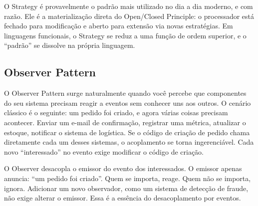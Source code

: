O Strategy é provavelmente o padrão mais utilizado no dia a dia moderno, e com
razão. Ele é a materialização direta do Open/Closed Principle: o processador
está fechado para modificação e aberto para extensão via novas estratégias.
Em linguagens funcionais, o Strategy se reduz a uma função de ordem superior,
e o ``padrão'' se dissolve na própria linguagem.

\subsection{Observer Pattern}

O Observer Pattern surge naturalmente quando você percebe que componentes do
seu sistema precisam reagir a eventos sem conhecer uns aos outros. O cenário
clássico é o seguinte: um pedido foi criado, e agora várias coisas precisam
acontecer. Enviar um e-mail de confirmação, registrar uma métrica, atualizar
o estoque, notificar o sistema de logística. Se o código de criação de pedido
chama diretamente cada um desses sistemas, o acoplamento se torna ingerenciável.
Cada novo ``interessado'' no evento exige modificar o código de criação.

O Observer desacopla o emissor do evento dos interessados. O emissor apenas
anuncia: ``um pedido foi criado''. Quem se importa, reage. Quem não se importa,
ignora. Adicionar um novo observador, como um sistema de detecção de
fraude, não exige alterar o emissor. Essa é a essência do desacoplamento
por eventos.

